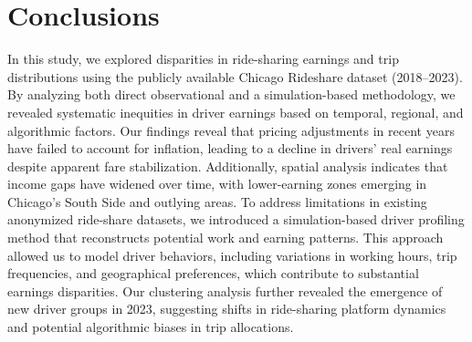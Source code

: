\section{Conclusions}
In this study, we explored disparities in ride-sharing earnings and trip distributions using the publicly available Chicago Rideshare dataset (2018–2023). By analyzing both direct observational and a simulation-based methodology, we revealed systematic inequities in driver earnings based on temporal, regional, and algorithmic factors. Our findings reveal that pricing adjustments in recent years have failed to account for inflation, leading to a decline in drivers’ real earnings despite apparent fare stabilization. Additionally, spatial analysis indicates that income gaps have widened over time, with lower-earning zones emerging in Chicago’s South Side and outlying areas.
To address limitations in existing anonymized ride-share datasets, we introduced a simulation-based driver profiling method that reconstructs potential work and earning patterns. This approach allowed us to model driver behaviors, including variations in working hours, trip frequencies, and geographical preferences, which contribute to substantial earnings disparities. Our clustering analysis further revealed the emergence of new driver groups in 2023, suggesting shifts in ride-sharing platform dynamics and potential algorithmic biases in trip allocations. 